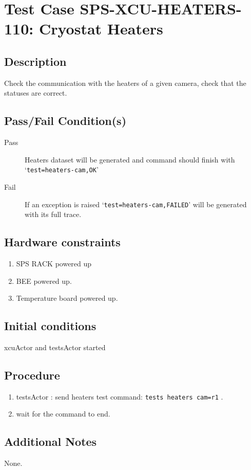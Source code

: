\section{Test Case SPS-XCU-HEATERS-110: Cryostat Heaters}

\subsection{Description}

Check the communication with the heaters of a given camera, check that the statuses are correct.

\subsection{Pass/Fail Condition(s)}

\begin{description}
\item [Pass] Heaters dataset will be generated and command should finish with `\texttt{test=heaters-cam,OK}'
\item [Fail] If an exception is raised `\texttt{test=heaters-cam,FAILED}' will be generated with its full trace.

\end{description}

\subsection{Hardware constraints}

\begin{enumerate}
    \item SPS RACK powered up
    \item \acrshort{BEE} powered up.
    \item Temperature board powered up.
\end{enumerate}

\subsection{Initial conditions}

xcuActor and testsActor started

\subsection{Procedure}

\begin{enumerate}
    \item testsActor : send heaters test command: \texttt{tests heaters cam=r1} .
    \item wait for the command to end.
\end{enumerate}

\subsection{Additional Notes}
None.

